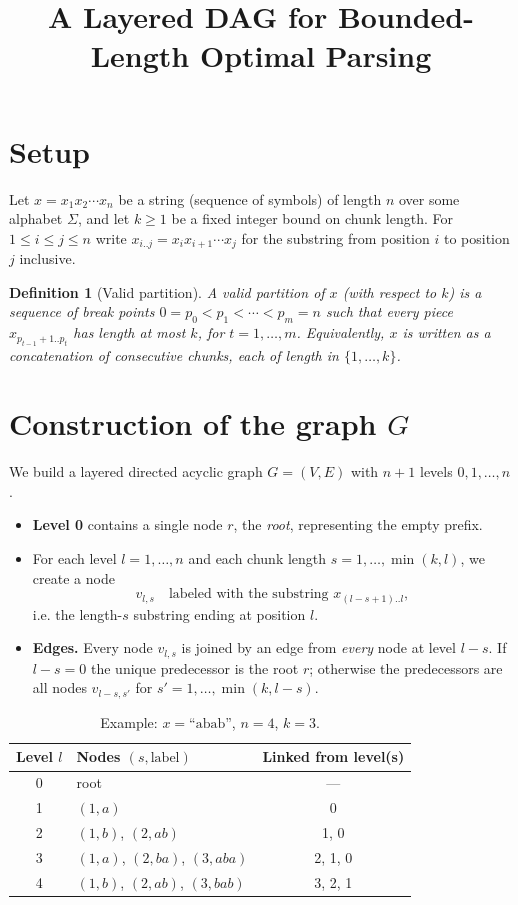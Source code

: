 \documentclass[11pt]{article}
\title{A Layered DAG for Bounded-Length Optimal Parsing}
\author{}
\date{}
\newtheorem{definition}{Definition}
\begin{document}
\maketitle

\section{Setup}

Let $x = x_1 x_2 \cdots x_n$ be a string (sequence of symbols) of length $n$ over some
alphabet $\Sigma$, and let $k \ge 1$ be a fixed integer bound on chunk length. For
$1 \le i \le j \le n$ write $x_{i..j} = x_i x_{i+1} \cdots x_j$ for the substring from
position $i$ to position $j$ inclusive.

\begin{definition}[Valid partition]
A \emph{valid partition} of $x$ (with respect to $k$) is a sequence of break points
$0 = p_0 < p_1 < \cdots < p_m = n$ such that every piece
$x_{p_{t-1}+1 .. p_t}$ has length at most $k$, for $t = 1, \dots, m$. Equivalently, $x$
is written as a concatenation of consecutive chunks, each of length in $\{1,\dots,k\}$.
\end{definition}

\section{Construction of the graph $G$}

We build a layered directed acyclic graph $G = (V, E)$ with $n+1$ levels
$0, 1, \dots, n$.

\begin{itemize}
  \item \textbf{Level 0} contains a single node $r$, the \emph{root}, representing the
  empty prefix.
  \item For each level $l = 1, \dots, n$ and each chunk length
  $s = 1, \dots, \min(k, l)$, we create a node
  \[
    v_{l,s} \quad \text{labeled with the substring } x_{(l-s+1)..l},
  \]
  i.e. the length-$s$ substring ending at position $l$.
  \item \textbf{Edges.} Every node $v_{l,s}$ is joined by an edge from \emph{every} node
  at level $l - s$. If $l - s = 0$ the unique predecessor is the root $r$; otherwise the
  predecessors are all nodes $v_{l-s, s'}$ for $s' = 1, \dots, \min(k, l-s)$.
\end{itemize}

\begin{table}[h]
\centering
\caption{Example: $x = \text{``abab''}$, $n = 4$, $k = 3$.}
\begin{tabular}{@{}clc@{}}
\toprule
Level $l$ & Nodes $(s, \text{label})$ & Linked from level(s) \\
\midrule
0 & root & --- \\
1 & $(1, a)$ & 0 \\
2 & $(1, b)$, $(2, ab)$ & 1, 0 \\
3 & $(1, a)$, $(2, ba)$, $(3, aba)$ & 2, 1, 0 \\
4 & $(1, b)$, $(2, ab)$, $(3, bab)$ & 3, 2, 1 \\
\bottomrule
\end{tabular}
\end{table}
\end{document}
